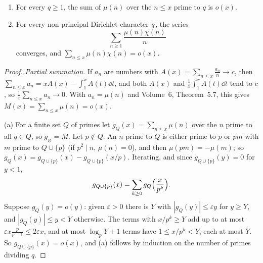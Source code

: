 \begin{lemma}\label{conjectures:lem:mobchi}
\begin{enumerate}[label=(\alph*)]
\item For every $q\ge1$, the sum of $\mu(n)$ over the $n\le x$ prime to $q$ is $o(x)$.
\item For every non-principal Dirichlet character $\chi$, the series
\[
\sum_{n\ge1}\frac{\mu(n)\chi(n)}n
\]
converges, and $\sum_{n\le x}\mu(n)\chi(n)=o(x)$.
\end{enumerate}
\end{lemma}
\begin{proof}
\emph{Partial summation.} If $a_n$ are numbers with $A(x)=\sum_{n\le x}\frac{a_n}n\to c$, then $\sum_{n\le x}a_n=xA(x)-\int_1^xA(t)\dd t$, and both $A(x)$ and
$\frac1x\int_1^xA(t)\dd t$ tend to $c$, so $\frac1x\sum_{n\le x}a_n\to0$. With $a_n=\mu(n)$ and Volume~6, Theorem~5.7, this gives $M(x)=\sum_{n\le x}\mu(n)=o(x)$.

(a) For a finite set $Q$ of primes let $g_Q(x)=\sum_{n\le x}\mu(n)$ over the $n$ prime to all $q\in Q$, so $g_\varnothing=M$. Let $p\notin Q$. An $n$ prime to $Q$ is
either prime to $p$ or $pm$ with $m$ prime to $Q\cup\{p\}$ (if $p^2\mid n$, $\mu(n)=0$), and then $\mu(pm)=-\mu(m)$; so $g_Q(x)=g_{Q\cup\{p\}}(x)-g_{Q\cup\{p\}}(x/p)$.
Iterating, and since $g_{Q\cup\{p\}}(y)=0$ for $y<1$,
\[
g_{Q\cup\{p\}}(x)=\sum_{k\ge0}g_Q\Bigl(\frac x{p^k}\Bigr).
\]
Suppose $g_Q(y)=o(y)$: given $\varepsilon>0$ there is $Y$ with $|g_Q(y)|\le\varepsilon y$ for $y\ge Y$, and $|g_Q(y)|\le y<Y$ otherwise. The terms with
$x/p^k\ge Y$ add up to at most $\varepsilon x\frac p{p-1}\le2\varepsilon x$, and at most $\log_pY+1$ terms have $1\le x/p^k<Y$, each at most $Y$. So
$g_{Q\cup\{p\}}(x)=o(x)$, and (a) follows by induction on the number of primes dividing $q$.


\end{proof}
